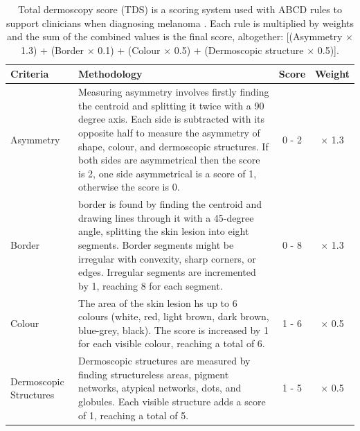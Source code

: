\documentclass[10.5pt]{report}
\begin{document}
\begin{table}
\small
\begin{tabular}{|p{2.5cm}|p{10cm}|c|c|}
	\hline
	Criteria & Methodology & Score & Weight \\
	\hline
	Asymmetry & Measuring asymmetry involves firstly finding the centroid and splitting it twice with a 90 degree axis. Each side is subtracted with its opposite half to measure the asymmetry of shape, colour, and dermoscopic structures. If both sides are asymmetrical then the score is 2, one side asymmetrical is a score of 1, otherwise the score is 0. & 0 - 2 & $\times$ 1.3 
	\\
	\hline
	Border & border is found by finding the centroid and drawing lines through it with a 45-degree angle, splitting the skin lesion into eight segments. Border segments might be irregular with convexity, sharp corners, or edges. Irregular segments are incremented by 1, reaching 8 for each segment.  & 0 - 8 & $\times$ 1.3 
	\\
	\hline
	Colour & The area of the skin lesion hs up to 6 colours (white, red, light brown, dark brown, blue-grey, black). The score is increased by 1 for each visible colour, reaching a total of 6. & 1 - 6 & $\times$ 0.5 
	\\
	\hline
	Dermoscopic Structures & Dermoscopic structures are measured by finding structureless areas, pigment networks, atypical networks, dots, and globules. Each visible structure adds a score of 1, reaching a total of 5. & 1 - 5 & $\times$ 0.5 
	\\
	\hline	
\end{tabular}
\caption{Total dermoscopy score (TDS) is a scoring system used with ABCD rules to support clinicians when diagnosing melanoma \cite{Cognetta1994}. Each rule is multiplied by weights and the sum of the combined values is the final score, altogether: [(Asymmetry $\times$ 1.3) $+$ (Border $\times$ 0.1) $+$ (Colour $\times$ 0.5) $+$ (Dermoscopic structure $\times$ 0.5)].}
\end{table} \label{TDS}
\end{document}
